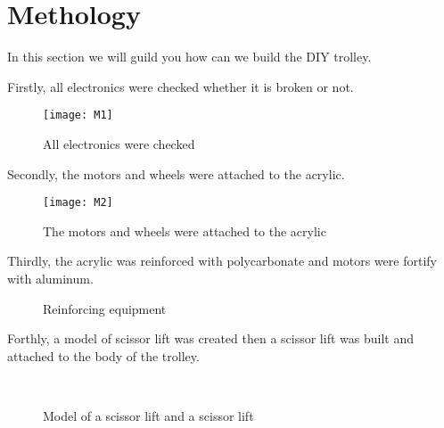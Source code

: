 \documentclass[12pt]{article}
\begin{document}
\section{Methology} \label{sec:methology}

In this section we will guild you how can we build the DIY trolley. \par
Firstly, all electronics were checked whether it is broken or not.

\begin{figure}[H]
	\centering
	\texttt{[image: M1]}
	\caption{All electronics were checked} \label{fig:m1}
\end{figure}

\par 

Secondly, the motors and wheels were attached to the acrylic.

\begin{figure}[H]
	\centering
	\texttt{[image: M2]}
	\caption{The motors and wheels were attached to the acrylic} \label{fig:m2}
\end{figure}

\par

Thirdly, the acrylic was reinforced with polycarbonate and motors were fortify with aluminum.

\begin{figure}[H]
	\centering
	 \hspace{1cm}
	\caption{Reinforcing equipment} \label{fig:m3m4}
\end{figure}

\par 

Forthly, a model of scissor lift was created then a scissor lift was built and attached to the body of the trolley.

\begin{figure}[H]
	\centering
	 \hspace{1cm}
	 \\ \vspace{0.5cm}
	\caption{Model of a scissor lift and a scissor lift} \label{fig:m3m}
\end{figure}
\end{document}
